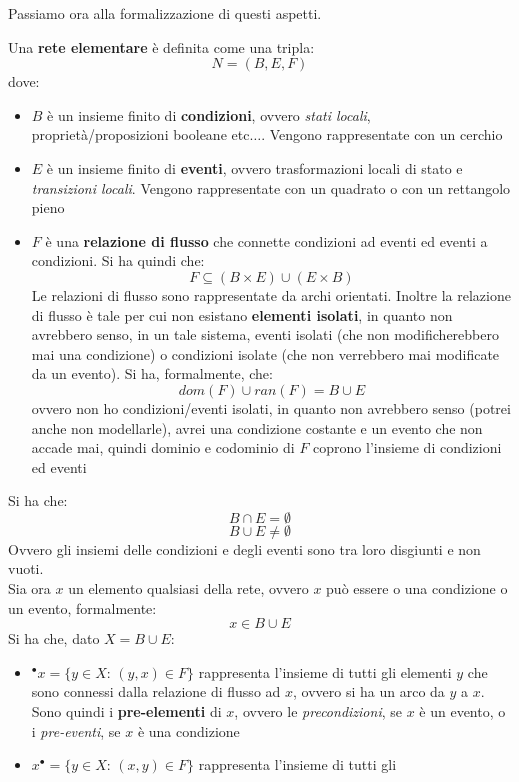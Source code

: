 \documentclass[a4paper,12pt, oneside]{book}
\begin{document}
Passiamo ora alla formalizzazione di questi aspetti.\\
\begin{definizione}
  Una \textbf{rete elementare} è definita come una tripla:
  \[N=(B,E,F)\]
  dove:
  \begin{itemize}
    \item $B$ è un insieme finito di \textbf{condizioni}, ovvero \textit{stati
      locali}, proprietà/proposizioni booleane etc$\ldots$. Vengono
    rappresentate con un cerchio 
    \item $E$ è un insieme finito di \textbf{eventi}, ovvero trasformazioni
    locali di stato e \textit{transizioni locali}. Vengono rappresentate con un
    quadrato o con un rettangolo pieno
    \item $F$ è una \textbf{relazione di flusso} che connette condizioni ad
    eventi ed eventi a condizioni. Si ha quindi che:
    \[F\subseteq (B\times E)\cup(E\times B)\]
    Le relazioni di flusso sono rappresentate da archi orientati. Inoltre la
    relazione di flusso è tale per cui non esistano \textbf{elementi isolati},
    in quanto non avrebbero senso, in un tale sistema, eventi isolati (che non
    modificherebbero mai una condizione) o condizioni isolate (che non
    verrebbero mai modificate da un evento). Si ha, formalmente, che: 
    \[dom(F)\cup ran(F)=B\cup E\]
    ovvero non ho condizioni/eventi isolati, in quanto non avrebbero senso
    (potrei anche non modellarle), avrei una condizione costante e un
    evento che non accade mai, quindi dominio e codominio di $F$ coprono
    l'insieme di condizioni ed eventi
  \end{itemize}
  Si ha che:
  \[B\cap E = \emptyset\]
  \[B\cup E \neq \emptyset\]
  Ovvero gli insiemi delle condizioni e degli eventi sono tra loro disgiunti e
  non vuoti.\\
  Sia ora $x$ un elemento qualsiasi della rete, ovvero $x$ può essere o una
  condizione o un evento, formalmente:
  \[x\in B\cup E\]
  Si ha che, dato $X=B\cup E$:
  \begin{itemize}
    \item $^\bullet x=\{y\in X:\,(y,x)\in F\}$ rappresenta l'insieme di tutti gli
    elementi $y$ che sono connessi dalla relazione di flusso ad $x$, ovvero si
    ha un arco da $y$ a $x$. Sono quindi i \textbf{pre-elementi} di $x$, ovvero
    le \textit{precondizioni}, se $x$ è un evento, o i \textit{pre-eventi}, se
    $x$ è una condizione
    \item $x^\bullet=\{y\in X:\,(x,y)\in F\}$ rappresenta l'insieme di tutti gli

\end{itemize}
\end{definizione}
\end{document}
